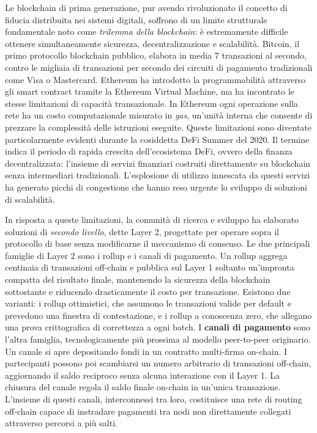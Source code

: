 \documentclass[12pt,a4paper,oneside]{book}
\begin{document}
Le blockchain di prima generazione, pur avendo rivoluzionato il concetto di fiducia distribuita nei sistemi digitali, soffrono di un limite strutturale fondamentale noto come \textit{trilemma della blockchain}: è estremamente difficile ottenere simultaneamente sicurezza, decentralizzazione e scalabilità. Bitcoin, il primo protocollo blockchain pubblico, elabora in media 7 transazioni al secondo, contro le migliaia di transazioni per secondo dei circuiti di pagamento tradizionali come Visa o Mastercard. Ethereum ha introdotto la programmabilità attraverso gli smart contract tramite la Ethereum Virtual Machine, ma ha incontrato le stesse limitazioni di capacità transazionale. In Ethereum ogni operazione sulla rete ha un costo computazionale misurato in \textit{gas}, un'unità interna che consente di prezzare la complessità delle istruzioni eseguite. Queste limitazioni sono diventate particolarmente evidenti durante la cosiddetta DeFi Summer del 2020. Il termine indica il periodo di rapida crescita dell'ecosistema DeFi, ovvero della finanza decentralizzata: l'insieme di servizi finanziari costruiti direttamente su blockchain senza intermediari tradizionali. L'esplosione di utilizzo innescata da questi servizi ha generato picchi di congestione che hanno reso urgente lo sviluppo di soluzioni di scalabilità.

In risposta a queste limitazioni, la comunità di ricerca e sviluppo ha elaborato soluzioni di \textit{secondo livello}, dette Layer 2, progettate per operare sopra il protocollo di base senza modificarne il meccanismo di consenso. Le due principali famiglie di Layer 2 sono i rollup e i canali di pagamento. Un rollup aggrega centinaia di transazioni off-chain e pubblica sul Layer 1 soltanto un'impronta compatta del risultato finale, mantenendo la sicurezza della blockchain sottostante e riducendo drasticamente il costo per transazione. Esistono due varianti: i rollup ottimistici, che assumono le transazioni valide per default e prevedono una finestra di contestazione, e i rollup a conoscenza zero, che allegano una prova crittografica di correttezza a ogni batch. I \textbf{canali di pagamento} sono l'altra famiglia, tecnologicamente più prossima al modello peer-to-peer originario. Un canale si apre depositando fondi in un contratto multi-firma on-chain. I partecipanti possono poi scambiarsi un numero arbitrario di transazioni off-chain, aggiornando il saldo reciproco senza alcuna interazione con il Layer 1. La chiusura del canale regola il saldo finale on-chain in un'unica transazione. L'insieme di questi canali, interconnessi tra loro, costituisce una rete di routing off-chain capace di instradare pagamenti tra nodi non direttamente collegati attraverso percorsi a più salti.
\end{document}

